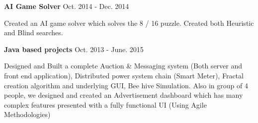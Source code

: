 \begin{cventries}
	
	
	
	\cventry
	{\textbf{AI Game Solver}} %
    {}
    {}
    {Oct. 2014 - Dec. 2014}
	{
	\begin{cvitems} %
	    \item Created an AI game solver which solves the 8 / 16 puzzle. Created both Heuristic and Blind searches.
	\end{cvitems}
	}
	

	
	
	\cventry
	{\textbf{Java based projects}} %
	{}
    {}
    {Oct. 2013 - June. 2015}
	{
	\begin{cvitems} %
	    \item Designed and Built a complete Auction \& Messaging system (Both server and front end application), Distributed power system chain (Smart Meter), Fractal creation algorithm and underlying GUI, Bee hive Simulation. Also in group of 4 people, we designed and created an Advertisement dashboard which has many complex features presented with a fully functional UI (Using Agile Methodologies)
	\end{cvitems}
	}
	

\end{cventries}
